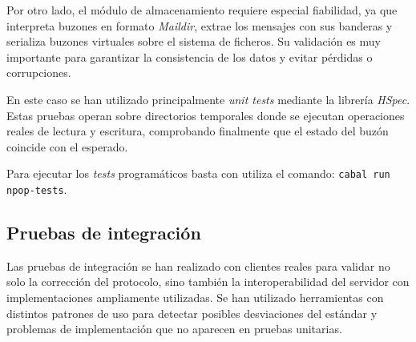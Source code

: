 \documentclass[a4paper]{CSMakotoTechnicalReport}
\begin{document}
Por otro lado, el módulo de almacenamiento requiere especial fiabilidad, ya que interpreta buzones en formato \textit{Maildir}, extrae los mensajes con sus banderas y serializa buzones virtuales sobre el sistema de ficheros. Su validación es muy importante para garantizar la consistencia de los datos y evitar pérdidas o corrupciones.

En este caso se han utilizado principalmente \textit{unit tests} mediante la librería \textit{HSpec}. Estas pruebas operan sobre directorios temporales donde se ejecutan operaciones reales de lectura y escritura, comprobando finalmente que el estado del buzón coincide con el esperado.

Para ejecutar los \textit{tests} programáticos basta con utiliza el comando: \texttt{cabal run npop-tests}.


\subsection{Pruebas de integración}

Las pruebas de integración se han realizado con clientes reales para validar no solo la corrección del protocolo, sino también la interoperabilidad del servidor con implementaciones ampliamente utilizadas. Se han utilizado herramientas con distintos patrones de uso para detectar posibles desviaciones del estándar y problemas de implementación que no aparecen en pruebas unitarias.
\end{document}
